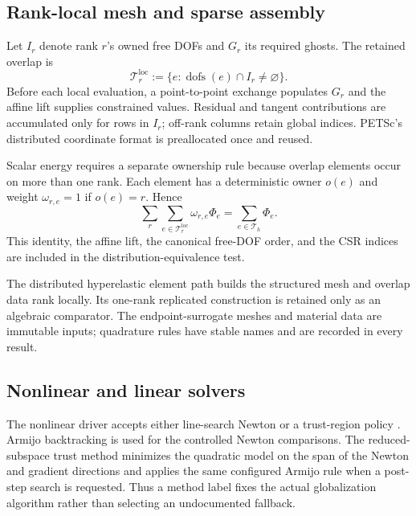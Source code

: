 \subsection{Rank-local mesh and sparse assembly}
\label{subsec:rank-local-assembly}

Let $I_r$ denote rank $r$'s owned free DOFs and $G_r$ its required ghosts. The
retained overlap is
\begin{equation}
  \mathcal{T}_r^{\mathrm{loc}}
  :=\{e:\operatorname{dofs}(e)\cap I_r\ne\varnothing\}.
  \label{eq:rank-overlap-elements}
\end{equation}
Before each local evaluation, a point-to-point exchange populates $G_r$ and
the affine lift supplies constrained values. Residual and tangent contributions
are accumulated only for rows in $I_r$; off-rank columns retain global indices.
PETSc's distributed coordinate format is preallocated once and reused.

Scalar energy requires a separate ownership rule because overlap elements occur
on more than one rank. Each element has a deterministic owner $o(e)$ and weight
$\omega_{r,e}=1$ if $o(e)=r$. Hence
\begin{equation}
  \sum_r\sum_{e\in\mathcal{T}_r^{\mathrm{loc}}}
  \omega_{r,e}\Phi_e
  =\sum_{e\in\mathcal{T}_h}\Phi_e.
  \label{eq:owned-element-energy}
\end{equation}
This identity, the affine lift, the canonical free-DOF order, and the CSR
indices are included in the distribution-equivalence test.

The distributed hyperelastic element path builds the structured mesh and overlap
data rank locally. Its one-rank replicated construction is retained only as an
algebraic comparator. The endpoint-surrogate meshes and material data are immutable
inputs; quadrature rules have stable names and are recorded in every result.

\subsection{Nonlinear and linear solvers}
\label{subsec:solver-implementation}

The nonlinear driver accepts either line-search Newton or a trust-region
policy \citep{nocedal2006numerical,conn2000trust}. Armijo backtracking is used for the controlled Newton comparisons. The
reduced-subspace trust method minimizes the quadratic model on the span of the
Newton and gradient directions and applies the same configured Armijo rule when
a post-step search is requested. Thus a method label fixes the actual
globalization algorithm rather than selecting an undocumented fallback.

